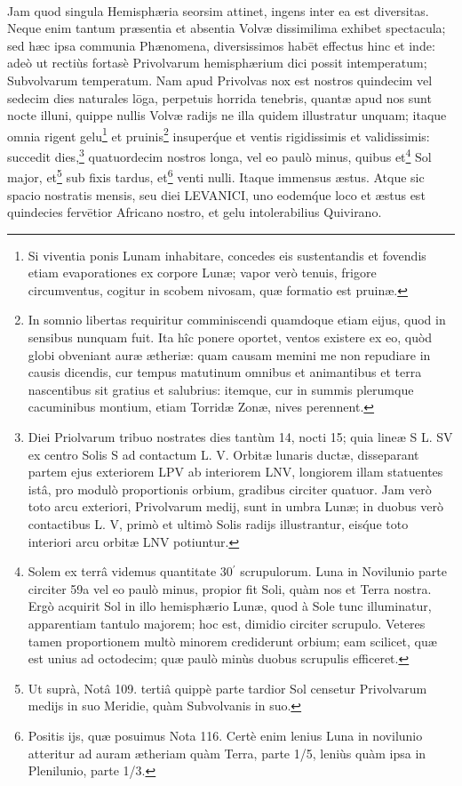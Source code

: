 \documentclass[a4paper, 11pt, oneside, polutonikogreek, german]{article}
\begin{document}
\paragraph{}
Jam quod singula Hemisphæria seorsim attinet, ingens inter ea est diversitas. Neque enim tantum præsentia et absentia Volvæ dissimilima exhibet spectacula; sed hæc ipsa communia Phænomena, diversissimos habēt effectus hinc et inde: adeò ut rectiùs fortasè Privolvarum hemisphærium dici possit intemperatum; Subvolvarum temperatum. Nam apud Privolvas nox est nostros quindecim vel sedecim dies naturales lōga, perpetuis horrida tenebris, quantæ apud nos sunt nocte illuni, quippe nullis Volvæ radijs ne illa quidem illustratur unquam; itaque omnia rigent gelu\footnote{Si viventia ponis Lunam inhabitare, concedes eis sustentandis et fovendis etiam evaporationes ex corpore Lunæ; vapor verò tenuis, frigore circumventus, cogitur in scobem nivosam, quæ formatio est pruinæ.} et pruinis\footnote{In somnio libertas requiritur comminiscendi quamdoque etiam eijus, quod in sensibus nunquam fuit. Ita hîc ponere oportet, ventos existere ex eo, quòd globi obveniant auræ ætheriæ: quam causam memini me non repudiare in causis dicendis, cur tempus matutinum omnibus et animantibus et terra nascentibus sit gratius et salubrius: itemque, cur in summis plerumque cacuminibus montium, etiam Torridæ Zonæ, nives perennent.} insuper\'que et ventis rigidissimis et validissimis: succedit dies,\footnote{Diei Priolvarum tribuo nostrates dies tantùm 14, nocti 15; quia lineæ S L. SV ex centro Solis S ad contactum L. V. Orbitæ lunaris ductæ, disseparant partem ejus exteriorem LPV ab interiorem LNV, longiorem illam statuentes istâ, pro modulò proportionis orbium, gradibus circiter quatuor. Jam verò toto arcu exteriori, Privolvarum medij, sunt in umbra Lunæ; in duobus verò contactibus L. V, primò et ultimò Solis radijs illustrantur, eis\'que toto interiori arcu orbitæ LNV potiuntur.} quatuordecim nostros longa, vel eo paulò minus, quibus et\footnote{Solem ex terrâ videmus quantitate 30$^{\prime}$ scrupulorum. Luna in Novilunio parte circiter 59a vel eo paulò minus, propior fit Soli, quàm nos et Terra nostra. Ergò acquirit Sol in illo hemisphærio Lunæ, quod à Sole tunc illuminatur, apparentiam tantulo majorem; hoc est, dimidio circiter scrupulo. Veteres tamen proportionem multò minorem crediderunt orbium; eam scilicet, quæ est unius ad octodecim; quæ paulò minùs duobus scrupulis efficeret.} Sol major, et\footnote{Ut suprà, Notâ 109. tertiâ quippè parte tardior Sol censetur Privolvarum medijs in suo Meridie, quàm Subvolvanis in suo.} sub fixis tardus, et\footnote{Positis ijs, quæ posuimus Nota 116. Certè enim lenius Luna in novilunio atteritur ad auram ætheriam quàm Terra, parte 1/5, leniùs quàm ipsa in Plenilunio, parte 1/3.} venti nulli. Itaque immensus æstus. Atque sic spacio nostratis mensis, seu diei LEVANICI, uno eodem\'que loco et æstus est quindecies fervētior Africano nostro, et gelu intolerabilius Quivirano.
\end{document}
